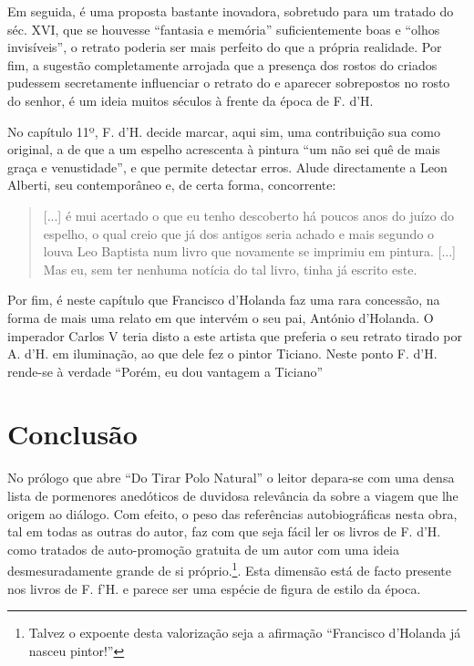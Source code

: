 \documentclass{article}
\begin{document}
Em seguida, é uma proposta bastante inovadora, sobretudo para um
tratado do séc. XVI, que se houvesse ``fantasia e memória''
suficientemente boas e ``olhos invisíveis'', o retrato poderia ser
mais perfeito do que a própria realidade. Por fim, a sugestão
completamente arrojada que a presença dos rostos do criados pudessem
secretamente influenciar o retrato do e aparecer sobrepostos no rosto
do senhor, é um ideia muitos séculos à frente da época de F. d'H.

No capítulo 11º, F. d'H. decide marcar, aqui sim, uma contribuição sua
como original, a de que a um espelho acrescenta à pintura ``um não sei
quê de mais graça e venustidade'', e que permite detectar erros. Alude
directamente a Leon Alberti, seu contemporâneo e, de certa forma,
concorrente\cite[p.41]{holanda}:

\begin{quote}
  [...] é mui acertado o que eu tenho descoberto há poucos anos do
  juízo do espelho, o qual creio que já dos antigos seria achado e
  mais segundo o louva Leo Baptista num livro que novamente se
  imprimiu em pintura. [...] Mas eu, sem ter nenhuma notícia do tal
  livro, tinha já escrito este.
\end{quote}

Por fim, é neste capítulo que Francisco d'Holanda faz uma rara
concessão, na forma de mais uma relato em que intervém o seu pai,
António d'Holanda. O imperador Carlos V teria disto a este artista que
preferia o seu retrato tirado por A. d'H. em iluminação, ao que dele
fez o pintor Ticiano. Neste ponto F. d'H. rende-se à verdade ``Porém, 
eu dou vantagem a Ticiano''\cite[p.42]{holanda}

\section{Conclusão}

No prólogo que abre ``Do Tirar Polo Natural'' o leitor depara-se com
uma densa lista de pormenores anedóticos de duvidosa relevância da
sobre a viagem que lhe origem ao diálogo. Com efeito, o peso das
referências autobiográficas nesta obra, tal em todas as outras do
autor, faz com que seja fácil ler os livros de F. d'H. como tratados
de auto-promoção gratuita de um autor com uma ideia desmesuradamente
grande de si próprio.\footnote{Talvez o expoente desta valorização
  seja a afirmação ``Francisco d'Holanda já nasceu
  pintor!''\cite{teresa-desenho}}. Esta dimensão está de facto presente nos
livros de F. f'H. e parece ser uma espécie de figura de estilo da
época.
\end{document}
